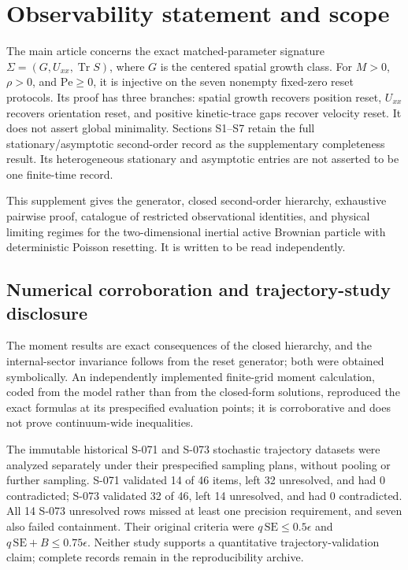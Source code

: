 \section{Observability statement and scope}\label{s0.-observability-statement-and-scope}

The main article concerns the exact matched-parameter signature \(\Sigma=(G,U_{xx},\operatorname{Tr}S)\), where \(G\) is the centered spatial growth class. For \(M>0\), \(\rho>0\), and \(\mathrm{Pe}\ge0\), it is injective on the seven nonempty fixed-zero reset protocols. Its proof has three branches: spatial growth recovers position reset, \(U_{xx}\) recovers orientation reset, and positive kinetic-trace gaps recover velocity reset. It does not assert global minimality. Sections S1--S7 retain the full stationary/asymptotic second-order record as the supplementary completeness result. Its heterogeneous stationary and asymptotic entries are not asserted to be one finite-time record.

This supplement gives the generator, closed second-order hierarchy, exhaustive pairwise proof, catalogue of restricted observational identities, and physical limiting regimes for the two-dimensional inertial active Brownian particle with deterministic Poisson resetting. It is written to be read independently.

\subsection{Numerical corroboration and trajectory-study disclosure}\label{s0.1-numerical-corroboration}

The moment results are exact consequences of the closed hierarchy, and the internal-sector invariance follows from the reset generator; both were obtained symbolically. An independently implemented finite-grid moment calculation, coded from the model rather than from the closed-form solutions, reproduced the exact formulas at its prespecified evaluation points; it is corroborative and does not prove continuum-wide inequalities.

The immutable historical S-071 and S-073 stochastic trajectory datasets were analyzed separately under their prespecified sampling plans, without pooling or further sampling. S-071 validated 14 of 46 items, left 32 unresolved, and had 0 contradicted; S-073 validated 32 of 46, left 14 unresolved, and had 0 contradicted. All 14 S-073 unresolved rows missed at least one precision requirement, and seven also failed containment. Their original criteria were $q\,\mathrm{SE}\leq0.5\epsilon$ and $q\,\mathrm{SE}+B\leq0.75\epsilon$. Neither study supports a quantitative trajectory-validation claim; complete records remain in the reproducibility archive.

